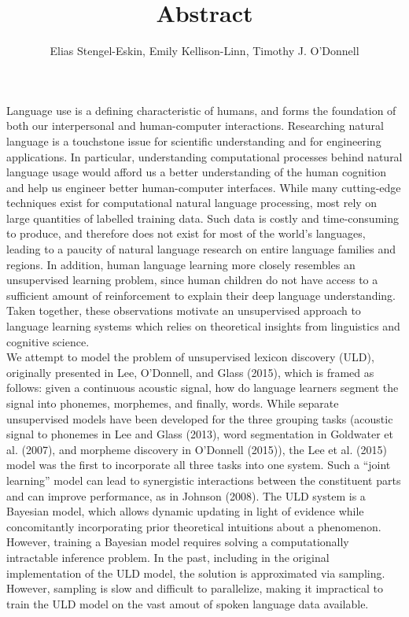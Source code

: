 \documentclass[12pt,letterpaper]{article}
\title{\vspace{-1.5cm} Abstract}
\author{Elias Stengel-Eskin, Emily Kellison-Linn, Timothy J. O'Donnell}
\newcommand\tab[1][1cm]{\hspace*{#1}}
\begin{document}
\maketitle
\tab Language use is a defining characteristic of humans, and forms the foundation of both our  interpersonal and human-computer interactions. Researching natural language is a touchstone issue for scientific understanding and for engineering applications. In particular, understanding  computational processes behind natural language usage would afford us a better understanding of the human cognition and help us engineer better human-computer interfaces. While many cutting-edge techniques exist for computational natural language processing, most rely on large quantities of labelled training data. Such data is costly and time-consuming to produce, and therefore does not exist for most of the world's languages, leading to a paucity of natural language research on entire language families and regions. In addition, human language learning more closely resembles an unsupervised learning problem, since human children do not have access to a sufficient amount of reinforcement to explain their deep language understanding. Taken together, these observations motivate an unsupervised approach to language learning systems which relies on theoretical insights from linguistics and cognitive science. \\ 
\tab We attempt to model the problem of unsupervised lexicon discovery (ULD), originally presented in Lee, O'Donnell, and Glass (2015), which is framed as follows: given a continuous acoustic signal, how do language learners segment the signal into phonemes, morphemes, and finally, words. While separate unsupervised models have been developed for the three grouping tasks (acoustic signal to phonemes in Lee and Glass (2013), word segmentation in Goldwater et al. (2007), and morpheme discovery in O'Donnell (2015)), the Lee et al. (2015) model was the first to incorporate all three tasks into one system. Such a ``joint learning'' model can lead to synergistic interactions between the constituent parts and can improve performance, as in Johnson (2008). The ULD system is a Bayesian model, which allows  dynamic updating in light of evidence while concomitantly incorporating prior theoretical intuitions about a phenomenon. However, training a Bayesian model requires solving a computationally intractable inference problem. In the past, including in the original implementation of the ULD model, the solution is approximated via sampling. However, sampling is slow and difficult to parallelize, making it impractical to train the ULD model on the vast amout of spoken language data available. \\
\end{document}
